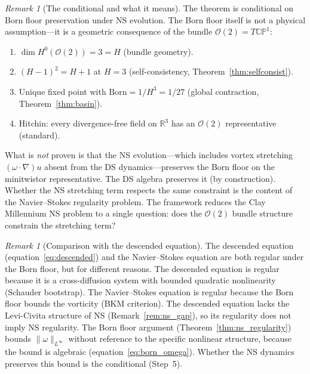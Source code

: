 \documentclass[11pt,a4paper]{article}
\theoremstyle{definition}
\theoremstyle{remark}
\newtheorem{remark}[theorem]{Remark}
\newcommand{\CP}{\mathbb{CP}}
\newcommand{\R}{\mathbb{R}}
\begin{document}
\begin{remark}[The conditional and what it means]\label{rem:ns_assumption}
The theorem is conditional on Born floor preservation under NS evolution. The Born floor itself is not a physical assumption---it is a geometric consequence of the bundle $\mathcal{O}(2)=T\CP^1$:
\begin{enumerate}[nosep]
\item $\dim H^0(\mathcal{O}(2))=3=H$ (bundle geometry).
\item $(H-1)^2=H+1$ at $H=3$ (self-consistency, Theorem~\ref{thm:selfconsist}).
\item Unique fixed point with $\mathrm{Born}=1/H^3=1/27$ (global contraction, Theorem~\ref{thm:basin}).
\item Hitchin: every divergence-free field on $\R^3$ has an $\mathcal{O}(2)$ representative (standard).
\end{enumerate}
What is \emph{not} proven is that the NS evolution---which includes vortex stretching $(\omega\cdot\nabla)u$ absent from the DS dynamics---preserves the Born floor on the minitwistor representative. The DS algebra preserves it (by construction). Whether the NS stretching term respects the same constraint is the content of the Navier--Stokes regularity problem. The framework reduces the Clay Millennium NS problem to a single question: does the $\mathcal{O}(2)$ bundle structure constrain the stretching term?
\end{remark}

\begin{remark}[Comparison with the descended equation]\label{rem:ns_comparison}
The descended equation (equation~\ref{eq:descended}) and the Navier--Stokes equation are both regular under the Born floor, but for different reasons. The descended equation is regular because it is a cross-diffusion system with bounded quadratic nonlinearity (Schauder bootstrap). The Navier--Stokes equation is regular because the Born floor bounds the vorticity (BKM criterion). The descended equation lacks the Levi-Civita structure of NS (Remark~\ref{rem:ns_gap}), so its regularity does not imply NS regularity. The Born floor argument (Theorem~\ref{thm:ns_regularity}) bounds $\|\omega\|_{L^\infty}$ without reference to the specific nonlinear structure, because the bound is algebraic (equation~\ref{eq:born_omega}). Whether the NS dynamics preserves this bound is the conditional (Step~5).
\end{remark}


\end{document}
